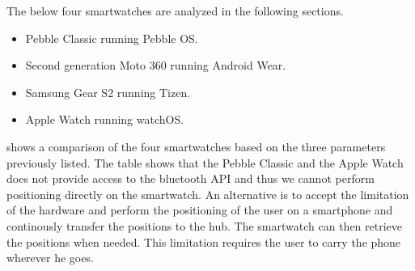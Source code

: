 The below four smartwatches are analyzed in the following sections.

\begin{itemize}
\item Pebble Classic running Pebble OS.
\item Second generation Moto 360 running Android Wear.
\item Samsung Gear S2 running Tizen.
\item Apple Watch running watchOS.
\end{itemize}

 shows a comparison of the four smartwatches based on the three parameters previously listed. The table shows that the Pebble Classic and the Apple Watch does not provide access to the bluetooth API and thus we cannot perform positioning directly on the smartwatch. An alternative is to accept the limitation of the hardware and perform the positioning of the user on a smartphone and continously transfer the positions to the hub. The smartwatch can then retrieve the positions when needed.
This limitation requires the user to carry the phone wherever he goes.

